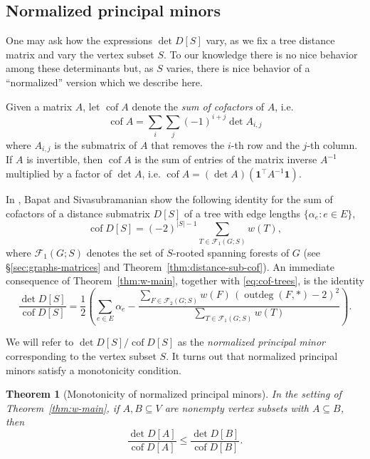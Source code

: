\documentclass[12pt]{amsart}
\newtheorem{mainthm}{Theorem}
\theoremstyle{definition}
\newcommand{\bone}{\mathbf{1}}
\newcommand{\tr}{\intercal}
\DeclareMathOperator{\cof}{cof}
\newcommand{\trees}{\mathcal{F}_1}
\newcommand{\forests}{\mathcal{F}}
\DeclareMathOperator{\outdeg}{outdeg}
\begin{document}
\subsection{Normalized principal minors}\label{sec:Normalized principal minors}
One may ask how the expressions $\det D[S]$ vary, as we fix a tree distance matrix and vary the vertex subset $S$.
To our knowledge there is no nice behavior among these determinants but, as $S$ varies, there is nice behavior of a ``normalized'' version which we describe here.

Given a matrix $A$, let $\cof A$ denote the {\em sum of cofactors} of $A$, i.e. 
\begin{equation}\label{eq:cof}
	\cof A = \sum_{i} \sum_{j} (-1)^{i + j} \det A_{i,j} 
\end{equation}
where $A_{i,j}$ is the submatrix of $A$ that removes the $i$-th row and the $j$-th column.
If $A$ is invertible, then $\cof A$ is the sum of entries of the matrix inverse $A^{-1}$ multiplied by a factor of $\det A$, i.e. $\cof A = (\det A) (\bone^\tr A^{-1} \bone)$.

In \cite{bapat-sivasubramanian}, Bapat and Sivasubramanian show the following identity for the sum of cofactors of a distance submatrix $D[S]$ of a tree with edge lengths $\{\alpha_e \colon e \in E\}$,
\begin{equation}\label{eq:cof-trees}
	\cof D[S] = (-2)^{|S| - 1} \!\!\!\sum_{T \in \trees(G;S)} w(T) , 
\end{equation}
where $\trees(G;S)$ denotes the set of $S$-rooted spanning forests of $G$ (see \S\ref{sec:graphs-matrices} and Theorem~\ref{thm:distance-sub-cof}).
An immediate consequence of Theorem~\ref{thm:w-main}, together with \eqref{eq:cof-trees}, is the identity
\begin{equation}\label{eq:det-cof}
	\frac{\det D[S]}{\cof D[S]} = \frac12 \left( \sum_{e \in E} \alpha_e - \frac{\sum_{F \in \forests_2(G; S)} w(F) \,(\outdeg(F,*) - 2)^2}{\sum_{T \in \trees(G; S)} w(T)} \right).
\end{equation}

We will refer to ${\det D[S]}/{\cof D[S]}$ as the {\em normalized principal minor} corresponding to the vertex subset $S$. 
It turns out that normalized principal minors satisfy a monotonicity condition.

\begin{mainthm}[Monotonicity of normalized principal minors]
\label{thm:monotonic}
	In the setting of Theorem~\ref{thm:w-main}, if $A, B \subseteq V$ are nonempty vertex subsets with $A \subseteq B$,
	then
	\begin{equation*}
		\frac{\det D[A]}{\cof D[A]}  \leq \frac{\det D[B]}{\cof D[B]}.
	\end{equation*}
\end{mainthm}
\end{document}
